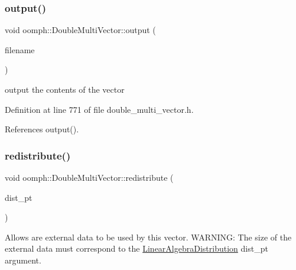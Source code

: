 \subsubsection{\texorpdfstring{output()}{output()}\hspace{0.1cm}{\footnotesize\ttfamily [2/2]}}
{\footnotesize\ttfamily void oomph\+::\+Double\+Multi\+Vector\+::output (\begin{DoxyParamCaption}\item[{std\+::string}]{filename }\end{DoxyParamCaption})\hspace{0.3cm}{\ttfamily [inline]}}



output the contents of the vector 



Definition at line 771 of file double\+\_\+multi\+\_\+vector.\+h.



References output().

\mbox{\label{classoomph_1_1DoubleMultiVector_a1a7f714e738c77e1938304c5911e09bf}} 
\subsubsection{\texorpdfstring{redistribute()}{redistribute()}}
{\footnotesize\ttfamily void oomph\+::\+Double\+Multi\+Vector\+::redistribute (\begin{DoxyParamCaption}\item[{const \hyperlink{classoomph_1_1LinearAlgebraDistribution}{Linear\+Algebra\+Distribution} $\ast$const \&}]{dist\+\_\+pt }\end{DoxyParamCaption})}



Allows are external data to be used by this vector. W\+A\+R\+N\+I\+NG\+: The size of the external data must correspond to the \hyperlink{classoomph_1_1LinearAlgebraDistribution}{Linear\+Algebra\+Distribution} dist\+\_\+pt argument. 


